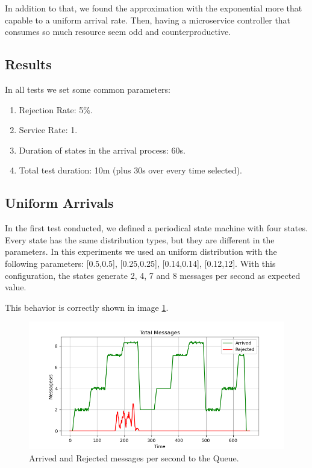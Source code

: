 In addition to that, we found the approximation with the exponential more that capable to a uniform arrival rate. Then, having a microservice controller that consumes so much resource seem odd and counterproductive.

\subsection{Results}
In all tests we set some common parameters:
\begin{enumerate}
    \item Rejection Rate: 5\%.
    \item Service Rate: 1.
    \item Duration of states in the arrival process: 60s.
    \item Total test duration: 10m (plus 30s over every time selected).
\end{enumerate}
\newpage
\subsection{Uniform Arrivals}
In the first test conducted, we defined a periodical state machine with four states. Every state has the same distribution types, but they are different in the parameters. In this experiments we used an uniform distribution with the following parameters: [0.5,0.5], [0.25,0.25], [0.14,0.14], [0.12,12]. With this configuration, the states generate 2, 4, 7 and 8 messages per second as expected value.

This behavior is correctly shown in image \ref{fig:uniform_messages}.

\begin{figure}[H]
    \centering
    \includegraphics[width=0.85\linewidth]{images/Uniform/messages.png}
    \caption{Arrived and Rejected messages per second to the Queue.}
    \label{fig:uniform_messages}
\end{figure}

